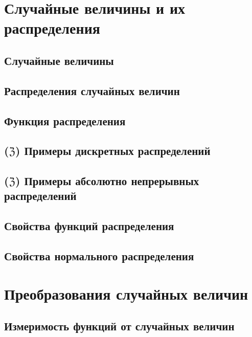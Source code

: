 \section{Случайные величины и их распределения}

\subsection{Случайные величины}


\subsection{Распределения случайных величин}


\subsection{Функция распределения}


\subsection{\texorpdfstring{($\mathfrak Z$)}{} Примеры дискретных распределений}


\subsection{\texorpdfstring{($\mathfrak Z$)}{} Примеры абсолютно непрерывных распределений}


\subsection{Свойства функций распределения}


\subsection{Свойства нормального распределения}






\section{Преобразования случайных величин}

\subsection{Измеримость функций от случайных величин}


